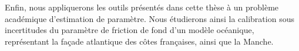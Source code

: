 Enfin, nous appliquerons les outils présentés dans cette thèse à un
problème académique d'estimation de paramètre. Nous étudierons ainsi
la calibration sous incertitudes du paramètre de friction de fond d'un
modèle océanique, représentant la façade atlantique des côtes
françaises, ainsi que la Manche.


\vfill